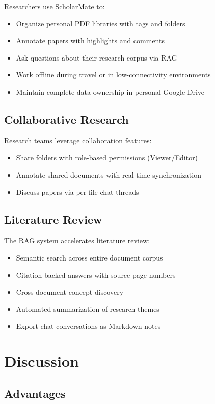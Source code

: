 \documentclass[conference]{IEEEtran}
\begin{document}
Researchers use ScholarMate to:
\begin{itemize}
\item Organize personal PDF libraries with tags and folders
\item Annotate papers with highlights and comments
\item Ask questions about their research corpus via RAG
\item Work offline during travel or in low-connectivity environments
\item Maintain complete data ownership in personal Google Drive
\end{itemize}

\subsection{Collaborative Research}

Research teams leverage collaboration features:
\begin{itemize}
\item Share folders with role-based permissions (Viewer/Editor)
\item Annotate shared documents with real-time synchronization
\item Discuss papers via per-file chat threads
\end{itemize}

\subsection{Literature Review}

The RAG system accelerates literature review:
\begin{itemize}
\item Semantic search across entire document corpus
\item Citation-backed answers with source page numbers
\item Cross-document concept discovery
\item Automated summarization of research themes
\item Export chat conversations as Markdown notes
\end{itemize}

\section{Discussion}

\subsection{Advantages}
\end{document}
